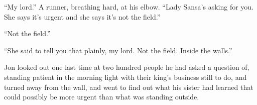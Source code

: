 “My lord.” A runner, breathing hard, at his elbow. “Lady Sansa’s asking for you. She says it’s urgent and she says it’s not the field.”

“Not the field.”

“She said to tell you that plainly, my lord. Not the field. Inside the walls.”

Jon looked out one last time at two hundred people he had asked a question of, standing patient in the morning light with their king’s business still to do, and turned away from the wall, and went to find out what his sister had learned that could possibly be more urgent than what was standing outside.